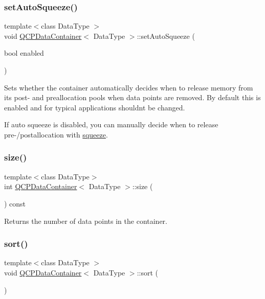 \subsubsection{\texorpdfstring{set\+Auto\+Squeeze()}{setAutoSqueeze()}}
{\footnotesize\ttfamily template$<$class Data\+Type $>$ \\
void \hyperlink{classQCPDataContainer}{Q\+C\+P\+Data\+Container}$<$ Data\+Type $>$\+::set\+Auto\+Squeeze (\begin{DoxyParamCaption}\item[{bool}]{enabled }\end{DoxyParamCaption})}

Sets whether the container automatically decides when to release memory from its post-\/ and preallocation pools when data points are removed. By default this is enabled and for typical applications shouldn\textquotesingle{}t be changed.

If auto squeeze is disabled, you can manually decide when to release pre-\//postallocation with \hyperlink{classQCPDataContainer_a82fcc511def22287fc62579d0706387c}{squeeze}. \mbox{\label{classQCPDataContainer_a8e9b262c739672e13472d0d45b720258}} 
\subsubsection{\texorpdfstring{size()}{size()}}
{\footnotesize\ttfamily template$<$class Data\+Type$>$ \\
int \hyperlink{classQCPDataContainer}{Q\+C\+P\+Data\+Container}$<$ Data\+Type $>$\+::size (\begin{DoxyParamCaption}{ }\end{DoxyParamCaption}) const\hspace{0.3cm}{\ttfamily [inline]}}

Returns the number of data points in the container. \mbox{\label{classQCPDataContainer_a75da92e33063b63d6da5014683591d45}} 
\subsubsection{\texorpdfstring{sort()}{sort()}}
{\footnotesize\ttfamily template$<$class Data\+Type $>$ \\
void \hyperlink{classQCPDataContainer}{Q\+C\+P\+Data\+Container}$<$ Data\+Type $>$\+::sort (\begin{DoxyParamCaption}{ }\end{DoxyParamCaption})}

